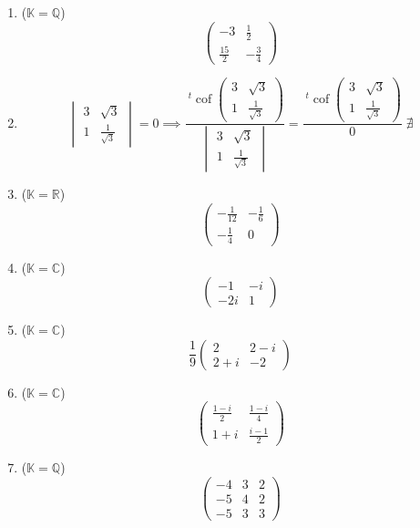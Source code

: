 \documentclass{article}
\theoremstyle{plain}
\theoremstyle{definition}
\theoremstyle{remark}
\begin{document}
\begin{enumerate}
    \item ($\mathbb{K}=\mathbb{Q}$)
    \[
      \begin{pmatrix}
      -3 & \frac{1}{2} \\
      \frac{15}{2} & -\frac{3}{4}
      \end{pmatrix}
    \]

    \item \[
      \begin{vmatrix}
      3 & \sqrt{3} \\
      1 & \tfrac{1}{\sqrt{3}}
      \end{vmatrix}=0\implies \dfrac{\ ^{t}\operatorname{cof}\begin{pmatrix}
        3 & \sqrt{3} \\
        1 & \tfrac{1}{\sqrt{3}}
        \end{pmatrix}}{\begin{vmatrix}
            3 & \sqrt{3} \\
            1 & \tfrac{1}{\sqrt{3}}
            \end{vmatrix}}=\dfrac{\ ^{t}\operatorname{cof}\begin{pmatrix}
                3 & \sqrt{3} \\
                1 & \tfrac{1}{\sqrt{3}}
                \end{pmatrix}}{0}\;\nexists
    \]
  
    \item($\mathbb{K}=\mathbb{R}$)
    \[
      \begin{pmatrix}
      -\frac{1}{12} & -\frac{1}{6} \\
      -\frac{1}{4} & 0
      \end{pmatrix}
    \]
  
    \item ($\mathbb{K}=\mathbb{C}$)
    \[
      \begin{pmatrix}
      -1 & -i \\
      -2i & 1
      \end{pmatrix}
    \]
  
    \item ($\mathbb{K}=\mathbb{C}$)
    \[
      \dfrac{1}{9}\begin{pmatrix}
      2 & 2 - i \\
      2 + i & -2
      \end{pmatrix}
    \]
  
    \item ($\mathbb{K}=\mathbb{C}$)
    \[
      \begin{pmatrix}
        \frac{1-i}{2} & \frac{1-i}{4} \\
      1+i & \frac{i-1}{2}
      \end{pmatrix}
    \]

    \item ($\mathbb{K}=\mathbb{Q}$)
    \[
      \begin{pmatrix}
        -4&3&2\\
        -5&4&2\\
        -5&3&3
      \end{pmatrix}
    \]
\end{enumerate}
\end{document}
